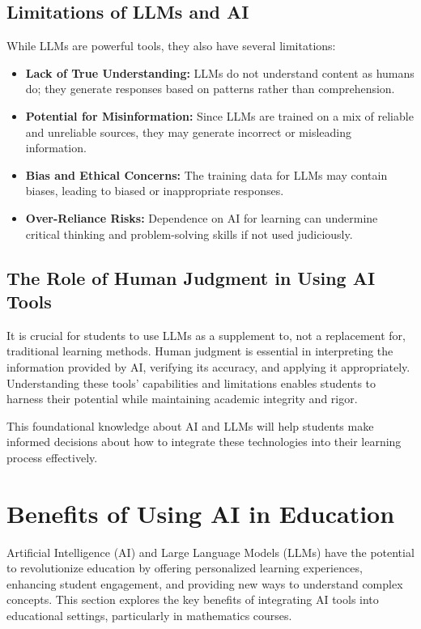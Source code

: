\documentclass{article}
\begin{document}
\subsection{Limitations of LLMs and AI}

While LLMs are powerful tools, they also have several limitations:
\begin{itemize}
    \item \textbf{Lack of True Understanding:} LLMs do not understand content as humans do; they generate responses based on patterns rather than comprehension.
    \item \textbf{Potential for Misinformation:} Since LLMs are trained on a mix of reliable and unreliable sources, they may generate incorrect or misleading information.
    \item \textbf{Bias and Ethical Concerns:} The training data for LLMs may contain biases, leading to biased or inappropriate responses.
    \item \textbf{Over-Reliance Risks:} Dependence on AI for learning can undermine critical thinking and problem-solving skills if not used judiciously.
\end{itemize}

\subsection{The Role of Human Judgment in Using AI Tools}

It is crucial for students to use LLMs as a supplement to, not a replacement for, traditional learning methods. Human judgment is essential in interpreting the information provided by AI, verifying its accuracy, and applying it appropriately. Understanding these tools' capabilities and limitations enables students to harness their potential while maintaining academic integrity and rigor.

This foundational knowledge about AI and LLMs will help students make informed decisions about how to integrate these technologies into their learning process effectively.


\section{Benefits of Using AI in Education}

Artificial Intelligence (AI) and Large Language Models (LLMs) have the potential to revolutionize education by offering personalized learning experiences, enhancing student engagement, and providing new ways to understand complex concepts. This section explores the key benefits of integrating AI tools into educational settings, particularly in mathematics courses.
\end{document}
